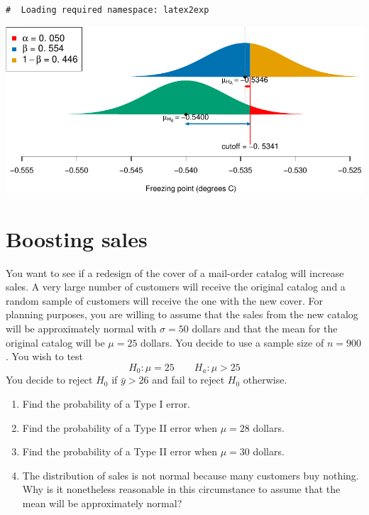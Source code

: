 \documentclass[letterpaper,9pt,twoside,printwatermark=false]{pinp}
\providecommand{\tightlist}{%
  \setlength{\itemsep}{0pt}\setlength{\parskip}{0pt}}
\begin{document}
\begin{ShadedResult}
\begin{verbatim}
#  Loading required namespace: latex2exp
\end{verbatim}
\end{ShadedResult}

\begin{center}\includegraphics{a6_power_proportions_files/figure-latex/unnamed-chunk-1-1} \end{center}

\section{Boosting sales}\label{boosting-sales}

You want to see if a redesign of the cover of a mail-order catalog will
increase sales. A very large number of customers will receive the
original catalog and a random sample of customers will receive the one
with the new cover. For planning purposes, you are willing to assume
that the sales from the new catalog will be approximately normal with
\(\sigma=50\) dollars and that the mean for the original catalog will be
\(\mu = 25\) dollars. You decide to use a sample size of \(n = 900\).
You wish to test \[H_0: \mu = 25 \qquad H_a: \mu > 25\]You decide to
reject \(H_0\) if \(\bar{y} > 26\) and fail to reject \(H_0\) otherwise.

\begin{enumerate}
\def\labelenumi{\alph{enumi}.}
\tightlist
\item
  Find the probability of a Type I error.
\item
  Find the probability of a Type II error when \(\mu = 28\) dollars.
\item
  Find the probability of a Type II error when \(\mu = 30\) dollars.
\item
  The distribution of sales is not normal because many customers buy
  nothing. Why is it nonetheless reasonable in this circumstance to
  assume that the mean will be approximately normal?
\end{enumerate}
\end{document}

